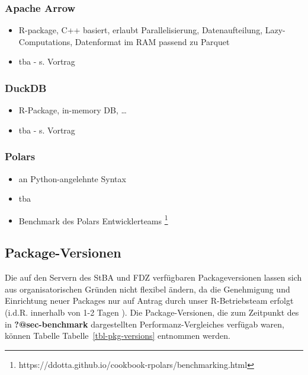 \documentclass[
  german,
  10pt,
  twoside]{article}
\providecommand{\tightlist}{%
  \setlength{\itemsep}{0pt}\setlength{\parskip}{0pt}}
\let\oldref\ref
\renewcommand{\ref}[1]{\oldref{#1}\raisebox{-0.2ex}{\scriptsize\color{wistaBlue}\ding{247}}}
\begin{document}
\subsubsection{Apache Arrow}\label{apache-arrow}

\begin{itemize}
\tightlist
\item
  R-package, C++ basiert, erlaubt Parallelisierung, Datenaufteilung,
  Lazy-Computations, Datenformat im RAM passend zu Parquet
\item
  tba - s. Vortrag
\end{itemize}

\subsubsection{DuckDB}\label{duckdb}

\begin{itemize}
\tightlist
\item
  R-Package, in-memory DB, \ldots{}
\item
  tba - s. Vortrag
\end{itemize}

\subsubsection{Polars}\label{polars}

\begin{itemize}
\tightlist
\item
  an Python-angelehnte Syntax
\item
  tba
\item
  Benchmark des Polars Entwicklerteams \footnote{https://ddotta.github.io/cookbook-rpolars/benchmarking.html}
\end{itemize}

\subsection{Package-Versionen}\label{package-versionen}

Die auf den Servern des StBA und FDZ verfügbaren Packageversionen lassen
sich aus organisatorischen Gründen nicht flexibel ändern, da die
Genehmigung und Einrichtung neuer Packages nur auf Antrag durch unser
R-Betriebsteam erfolgt (i.d.R. innerhalb von 1-2 Tagen ). Die
Package-Versionen, die zum Zeitpunkt des in \textbf{?@sec-benchmark}
dargestellten Performanz-Vergleiches verfügab waren, können Tabelle
Tabelle~\ref{tbl-pkg-versions} entnommen werden.
\end{document}
